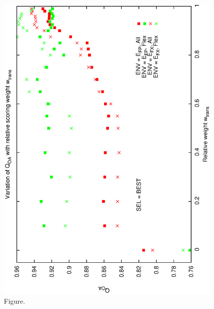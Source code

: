 \documentclass[12pt,a4paper]{article}
\begin{document}
\begin{figure}[htbp]
 \begin{center}
  \includegraphics[scale=1.0, angle=0]{figures/cs1_dw1_oa_c.eps}
 \end{center}
  \caption[Figure.]
{Figure.}
\end{figure}
\clearpage
\end{document}
